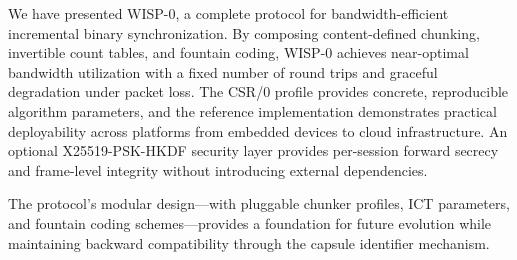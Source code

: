 \documentclass[11pt,twocolumn]{article}
\theoremstyle{definition}
\begin{document}
We have presented WISP-0, a complete protocol for bandwidth-efficient
incremental binary synchronization. By composing content-defined
chunking, invertible count tables, and fountain coding, WISP-0 achieves
near-optimal bandwidth utilization with a fixed number of round trips
and graceful degradation under packet loss. The CSR/0 profile provides
concrete, reproducible algorithm parameters, and the reference
implementation demonstrates practical deployability across platforms
from embedded devices to cloud infrastructure. An optional X25519-PSK-HKDF
security layer provides per-session forward secrecy and frame-level
integrity without introducing external dependencies.

The protocol's modular design---with pluggable chunker profiles, ICT
parameters, and fountain coding schemes---provides a foundation for
future evolution while maintaining backward compatibility through the
capsule identifier mechanism.
\end{document}

